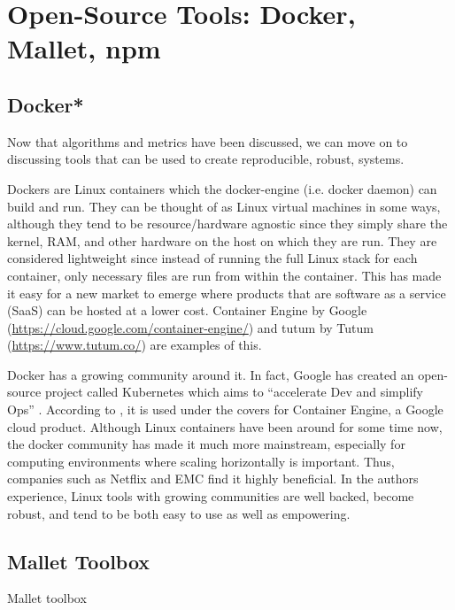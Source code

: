 



\section{Open-Source Tools: Docker, Mallet, npm}

\subsection{Docker*}
Now that algorithms and metrics have been discussed, we can move on to discussing tools that can be used to create reproducible, robust, systems.

Dockers are Linux containers which the docker-engine (i.e. docker daemon) can build and run. They can be thought of as Linux virtual machines in some ways, although they tend to be resource/hardware agnostic since they simply share the kernel, RAM, and other hardware on the host on which they are run. They are considered lightweight since instead of running the full Linux stack for each container, only necessary files are run from within the container. This has made it easy for a new market to emerge where products that are software as a service (SaaS) can be hosted at a lower cost. Container Engine by Google (\url{https://cloud.google.com/container-engine/}) and tutum by Tutum (\url{https://www.tutum.co/}) are examples of this.

Docker has a growing community around it. In fact, Google has created an open-source project called Kubernetes which aims to ``accelerate Dev and simplify Ops'' \citep{kube_website}. According to \citet{google_container_engine}, it is used under the covers for Container Engine, a Google cloud product. Although Linux containers have been around for some time now, the docker community has made it much more mainstream, especially for computing environments where scaling horizontally is important. Thus, companies such as Netflix and EMC find it highly beneficial. In the authors experience, Linux tools with growing communities are well backed, become robust, and tend to be both easy to use as well as empowering.

\subsection{Mallet Toolbox}
Mallet toolbox

